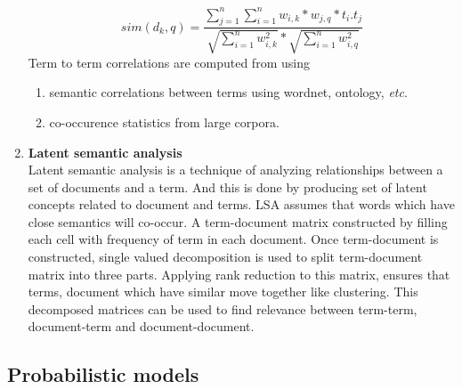 \begin{enumerate}
\begin{equation}
sim(d_k, q) = \frac{ \sum_{j=1}^{n} \sum_{i=1}^{n} w_{i,k} * w_{j,q} * t_{i}.t_{j}  }{\sqrt{\sum_{i=1}^{n} w_{i,k}^2} * \sqrt{\sum_{i=1}^{n} w_{i,q}^2}}
\end{equation}
Term to term correlations are computed from using
\begin{enumerate}
\item{semantic correlations between terms using wordnet, ontology, \textit{etc}.}
\item{co-occurence statistics from large corpora.}
\end{enumerate}

\item{\textbf{Latent semantic analysis}}\\
Latent semantic analysis is a technique of analyzing relationships between a set of documents and a term. And this is done by producing set of latent concepts related to document and terms. LSA assumes that words which have close semantics will co-occur. A term-document matrix constructed by filling each cell with frequency of term in each document. Once term-document is constructed, single valued decomposition is used to split term-document matrix into three parts. Applying rank reduction to this matrix, ensures that terms, document which have similar move together like clustering. This decomposed matrices can be used to find relevance between term-term, document-term and document-document.


\end{enumerate}



\subsection {Probabilistic models}

